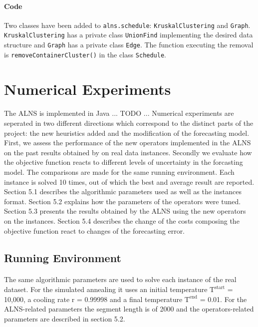 \documentclass[12pt,a4paper]{article}
\begin{document}
\paragraph{Code}
Two classes have been added to \texttt{alns.schedule}: \texttt{KruskalClustering} and \texttt{Graph}. \texttt{KruskalClustering} has a private class \texttt{UnionFind} implementing the desired data structure and \texttt{Graph} has a private class \texttt{Edge}. The function executing the removal is \texttt{removeContainerCluster()} in the class \texttt{Schedule}.

\section{Numerical Experiments}
\paragraph{}
The ALNS is implemented in Java ... TODO ...
Numerical experiments are seperated in two different directions which correspond to the distinct parts of the project: the new heuristics added and the modification of the forecasting model. First, we assess the performance of the new operators implemented in the ALNS on the past results obtained by \cite{Markov2016} on real data instances. Secondly we evaluate how the objective function reacts to different levels of uncertainty in the forcasting model.
The comparisons are made for the same running environment. Each instance is solved 10 times, out of which the best and average result are reported. Section 5.1 describes the algorithmic parameters used as well as the instances format. Section 5.2 explains how the parameters of the operators were tuned. Section 5.3 presents the results obtained by the ALNS using the new operators on the instances. Section 5.4 describes the change of the costs composing the objective function react to changes of the forecasting error.

\subsection{Running Environment}
\paragraph{}
The same algorithmic parameters are used to solve each instance of the real dataset. For the simulated annealing it uses an initial temperature $\text{T}^{\text{start}}$ = 10,000, a cooling rate r = 0.99998 and a final temperature $\text{T}^{\text{end}}$ = 0.01. For the ALNS-related parameters the segment length is of 2000 and the operators-related parameters are described in section 5.2. \\
\end{document}
